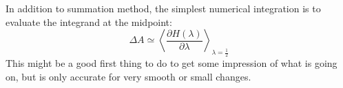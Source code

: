 In addition to summation method, the simplest numerical integration is to evaluate the integrand at the midpoint:
\begin{equation}
\Delta A \simeq \left \langle \frac{\partial{H(\lambda)}}{\partial{\lambda}} \right \rangle_{\lambda=\frac{1}{2}}
\label{Eq:FEM:TI:TI1}
\end{equation} 
This might be a good first thing to do to get some impression of what is going on, but is only accurate for very smooth or small changes. %
	
